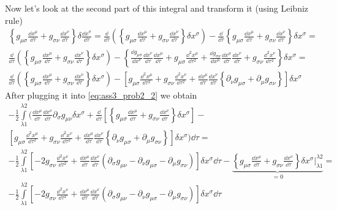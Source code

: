 %
Now let's look at the second part of this integral and transform it (using
Leibniz rule)
%
\begin{multline}
    \left\{g_{\mu\sigma}\frac{\dd x^\mu}{\dd\tau} +
    g_{\sigma\nu}\frac{\dd x^\nu}{\dd\tau}\right\} \delta \frac{\dd x^\sigma}{\dd\tau} =
    \frac{\dd}{\dd \tau} \left(\left\{g_{\mu\sigma}\frac{\dd x^\mu}{\dd\tau} +
    g_{\sigma\nu}\frac{\dd x^\nu}{\dd\tau}\right\}\delta x^\sigma\right) -
    \frac{\dd}{\dd \tau} \left\{g_{\mu\sigma}\frac{\dd x^\mu}{\dd\tau} +
    g_{\sigma\nu}\frac{\dd x^\nu}{\dd\tau}\right\}\delta x^\sigma = \\
    \frac{\dd}{\dd \tau} \left(\left\{g_{\mu\sigma}\frac{\dd x^\mu}{\dd\tau} +
    g_{\sigma\nu}\frac{\dd x^\nu}{\dd\tau}\right\}\delta x^\sigma\right) -
    \left\{
    \frac{\dd g_{\mu\sigma}}{\dd x^\nu}\frac{\dd x^\nu}{\dd\tau}\frac{\dd x^\mu}{\dd\tau} +
    g_{\mu\sigma}\frac{\dd^2 x^\mu}{\dd \tau^2} +
    \frac{\dd g_{\sigma\nu}}{\dd x^\mu}\frac{\dd x^\mu}{\dd\tau}\frac{\dd x^\nu}{\dd\tau}+
    g_{\sigma\nu}\frac{\dd^2 x^\nu}{\dd \tau^2} \right\}\delta x^\sigma = \\
    \frac{\dd}{\dd \tau} \left(\left\{g_{\mu\sigma}\frac{\dd x^\mu}{\dd\tau} +
    g_{\sigma\nu}\frac{\dd x^\nu}{\dd\tau}\right\}\delta x^\sigma\right) -
    \left[g_{\mu\sigma}\frac{\dd^2 x^\mu}{\dd \tau^2} +
        g_{\sigma\nu}\frac{\dd^2 x^\nu}{\dd \tau^2} +
        \frac{\dd x^\mu}{\dd\tau}\frac{\dd x^\nu}{\dd\tau}
        \left\{\partial_\nu g_{\mu\sigma} + \partial_\mu g_{\sigma\nu}\right\}\right]\delta x^\sigma
\end{multline}
%
After plugging it into \autoref{eq:ass3_prob2_2} we obtain
%
\begin{multline}
    -\frac{1}{2}\int\limits_{\lambda1}^{\lambda2}
    \Bigg(\frac{\dd x^\mu}{\dd\tau}\frac{\dd x^\nu}{\dd\tau} \partial_\sigma g_{\mu\nu} \delta x^\sigma +
    \frac{\dd}{\dd \tau} \left[\left\{g_{\mu\sigma}\frac{\dd x^\mu}{\dd\tau} +
        g_{\sigma\nu}\frac{\dd x^\nu}{\dd\tau}\right\}\delta x^\sigma\right] - \\
    \left[g_{\mu\sigma}\frac{\dd^2 x^\mu}{\dd \tau^2} +
        g_{\sigma\nu}\frac{\dd^2 x^\nu}{\dd \tau^2} +
        \frac{\dd x^\mu}{\dd\tau}\frac{\dd x^\nu}{\dd\tau}
        \left\{\partial_\nu g_{\mu\sigma} + \partial_\mu g_{\sigma\nu}\right\}\right]\delta x^\sigma\Bigg)\dd\tau = \\
    -\frac{1}{2}\int\limits_{\lambda1}^{\lambda2}
    \left[
        -2 g_{\sigma\nu}\frac{\dd^2 x^\nu}{\dd \tau^2} +
        \frac{\dd x^\mu}{\dd\tau}\frac{\dd x^\nu}{\dd\tau}
        \left(
        \partial_\sigma g_{\mu\nu}  -
        \partial_\nu g_{\mu\sigma} -
        \partial_\mu g_{\sigma\nu}\right)\right]\delta x^\sigma \dd\tau-
    \underbrace{\left\{g_{\mu\sigma}\frac{\dd x^\mu}{\dd\tau} +
    g_{\sigma\nu}\frac{\dd x^\nu}{\dd\tau}\right\}\delta x^\sigma \Bigg|_{\lambda1}^{\lambda2}}_{=0} = \\
    -\frac{1}{2}\int\limits_{\lambda1}^{\lambda2}
    \left[
        -2 g_{\sigma\nu}\frac{\dd^2 x^\nu}{\dd \tau^2} +
        \frac{\dd x^\mu}{\dd\tau}\frac{\dd x^\nu}{\dd\tau}
        \left(
        \partial_\sigma g_{\mu\nu}  -
        \partial_\nu g_{\mu\sigma} -
        \partial_\mu g_{\sigma\nu}\right)\right]\delta x^\sigma \dd\tau
\end{multline}

